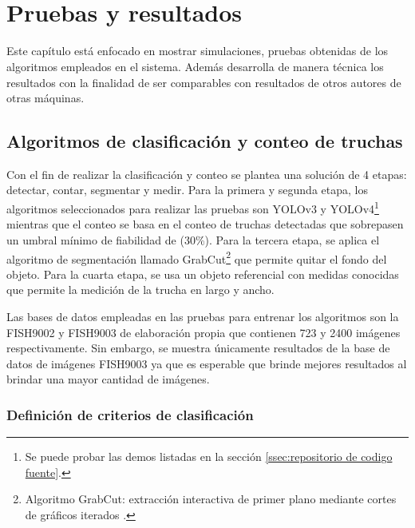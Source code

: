 
\pagestyle{myportland}
\doublespacing
\chapter[\quad\quad\quad\quad ----- Pruebas y resultados]{\\ Pruebas y resultados}
\thispagestyle{myportland}

Este capítulo está enfocado en mostrar simulaciones, pruebas obtenidas de los algoritmos empleados en el sistema. Además desarrolla de manera técnica los resultados con la finalidad de ser comparables con resultados de otros autores de otras máquinas.

\section{Algoritmos de clasificación y conteo de truchas}

Con el fin de realizar la clasificación y conteo se plantea una solución de 4 etapas: detectar, contar, segmentar y medir. Para la primera y segunda etapa, los algoritmos seleccionados para realizar las pruebas son YOLOv3 y YOLOv4\footnote{Se puede probar las demos listadas en la sección \ref{ssec:repositorio de codigo fuente}.} mientras que el conteo se basa en el conteo de truchas detectadas que sobrepasen un umbral mínimo de fiabilidad de (30\%). Para la tercera etapa, se aplica el algoritmo de segmentación llamado GrabCut\footnote{Algoritmo GrabCut: extracción interactiva de primer plano mediante cortes de gráficos iterados \cite{Rother2004}.} que permite quitar el fondo del objeto. Para la cuarta etapa, se usa un objeto referencial con medidas conocidas que permite la medición de la trucha en largo y ancho.

Las bases de datos empleadas en las pruebas para entrenar los algoritmos son la FISH9002 y FISH9003 de elaboración propia que contienen 723 y 2400 imágenes respectivamente. Sin embargo, se muestra únicamente resultados de la base de datos de imágenes FISH9003 ya que es esperable que brinde mejores resultados al brindar una mayor cantidad de imágenes.


\subsection{Definición de criterios de clasificación}

